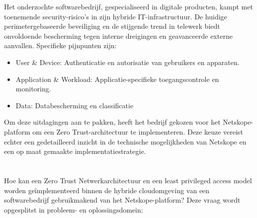 
Het onderzochte softwarebedrijf, gespecialiseerd in digitale producten, kampt met toenemende security-risico’s in zijn hybride IT-infrastructuur. 
De huidige perimetergebaseerde beveiliging en de stijgende trend in telewerk biedt onvoldoende bescherming tegen interne dreigingen en geavanceerde externe aanvallen. 
Specifieke pijnpunten zijn:

\begin{itemize}
  \item User \& Device: Authenticatie en autorisatie van gebruikers en apparaten.
	\item Application \& Workload: Applicatie-specifieke toegangscontrole en monitoring.
  \item Data: Databescherming en classificatie
\end{itemize}

Om deze uitdagingen aan te pakken, heeft het bedrijf gekozen voor het Netskope-platform om een Zero Trust-architectuur te implementeren. Deze keuze vereist echter een gedetailleerd inzicht in de technische mogelijkheden van Netskope en een op maat gemaakte implementatiestrategie.

\section{}%
\label{sec:onderzoeksvraag}


Hoe kan een Zero Trust Netwerkarchitectuur en een least privileged access model worden geïmplementeerd binnen de hybride cloudomgeving van een softwarebedrijf gebruikmakend van het Netskope-platform?
Deze vraag wordt opgesplitst in probleem- en oplossingsdomein:


